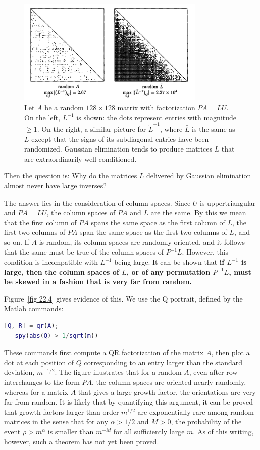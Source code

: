 \begin{figure}[H]
    \centering
    \includegraphics[width=0.8\textwidth]{figures/22-3.png}
    \caption{Let $A$ be a random $128 \times 128$ matrix with factorization $P A=L U$. On the left, $L^{-1}$ is shown: the dots represent entries with magnitude $\geq 1$. On the right, a similar picture for $\tilde{L}^{-1}$, where $\bar{L}$ is the same as $L$ except that the signs of its subdiagonal entries have been randomized. Gaussian elimination tends to produce matrices $L$ that are extraordinarily well-conditioned. }
\end{figure}

Then the question is: Why do the matrices $L$ delivered by Gaussian elimination almost never have large inverses?

The answer lies in the consideration of column spaces. Since $U$ is uppertriangular and $P A=L U$, the column spaces of $P A$ and $L$ are the same. By this we mean that the first column of $P A$ spans the same space as the first column of $L$, the first two columns of $P A$ span the same space as the first two columns of $L$, and so on. If $A$ is random, its column spaces are randomly oriented, and it follows that the same must be true of the column spaces of $P^{-1} L$. However, this condition is incompatible with $L^{-1}$ being large. It can be shown that \textbf{if $L^{-1}$ is large, then the column spaces of $L$, or of any permutation $P^{-1} L$, must be skewed in a fashion that is very far from random.}

Figure~\ref{fig 22.4} gives evidence of this. We use the Q portrait, defined by the Matlab commands: 
\begin{lstlisting}[language=Matlab]
   [Q, R] = qr(A); 
   spy(abs(Q) > 1/sqrt(m))
\end{lstlisting}
These commands first compute a QR factorization of the matrix $A$, then plot a dot at each position of $Q$ corresponding to an entry larger than the standard deviation, $m^{-1 / 2}$. The figure illustrates that for a random $A$, even after row interchanges to the form $P A$, the column spaces are oriented nearly randomly, whereas for a matrix $A$ that gives a large growth factor, the orientations are very far from random. It is likely that by quantifying this argument, it can be proved that growth factors larger than order $m^{1 / 2}$ are exponentially rare among random matrices in the sense that for any $\alpha>1 / 2$ and $M>0$, the probability of the event $\rho>m^\alpha$ is smaller than $m^{-M}$ for all sufficiently large $m$. As of this writing, however, such a theorem has not yet been proved.


